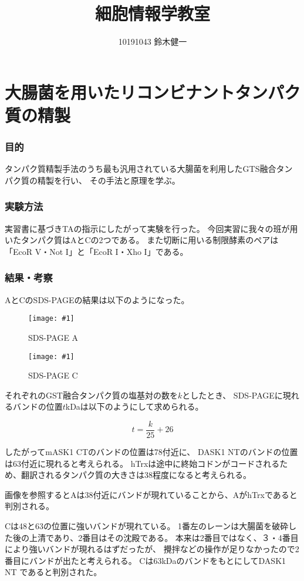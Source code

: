 \documentclass[a4paper,papersize,dvipdfmx]{jsarticle}
\newcommand{\piccap}[3]{\begin{figure}[H] \centering \texttt{[image: \#1]} \caption{#3} \label{fig {#1}} \end{figure}} %
\begin{document}
\title{細胞情報学教室}
\author{10191043 鈴木健一}
\date{}
\maketitle



\part*{大腸菌を用いたリコンビナントタンパク質の精製}

\section*{目的}
タンパク質精製手法のうち最も汎用されている大腸菌を利用したGTS融合タンパク質の精製を行い、
その手法と原理を学ぶ。

\section*{実験方法}
実習書に基づきTAの指示にしたがって実験を行った。
今回実習に我々の班が用いたタンパク質はAとCの2つである。
また切断に用いる制限酵素のペアは
「EcoR V・Not I」と「EcoR I・Xho I」である。


\section*{結果・考察}

AとCのSDS-PAGEの結果は以下のようになった。
\piccap{edo_a.jpg}{8}{SDS-PAGE A}
\piccap{edo_c.jpg}{8}{SDS-PAGE C}

それぞれのGST融合タンパク質の塩基対の数を$k$としたとき、
SDS-PAGEに現れるバンドの位置$t$kDaは以下のようにして求められる。

\[t = \frac{k}{25} + 26 \]

したがってmASK1 CTのバンドの位置は78付近に、
DASK1 NTのバンドの位置は63付近に現れると考えられる。
hTrxは途中に終始コドンがコードされるため、翻訳されるタンパク質の大きさは38程度になると考えられる。

画像を参照するとAは38付近にバンドが現れていることから、AがhTrxであると判別される。

Cは48と63の位置に強いバンドが現れている。
1番左のレーンは大腸菌を破砕した後の上清であり、2番目はその沈殿である。
本来は2番目ではなく、３・4番目により強いバンドが現れるはずだったが、
攪拌などの操作が足りなかったので2番目にバンドが出たと考えられる。
Cは63kDaのバンドをもとにしてDASK1 NT であると判別された。
\end{document}
